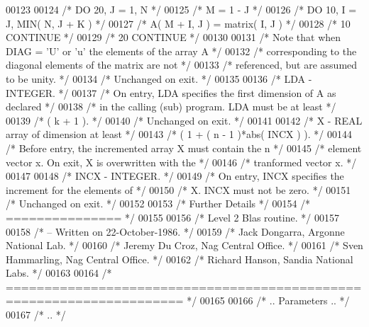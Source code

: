 \begin{DoxyCode}
00123 
00124 \textcolor{comment}{/*                 DO 20, J = 1, N */}
00125 \textcolor{comment}{/*                    M = 1 - J */}
00126 \textcolor{comment}{/*                    DO 10, I = J, MIN( N, J + K ) */}
00127 \textcolor{comment}{/*                       A( M + I, J ) = matrix( I, J ) */}
00128 \textcolor{comment}{/*              10    CONTINUE */}
00129 \textcolor{comment}{/*              20 CONTINUE */}
00130 
00131 \textcolor{comment}{/*           Note that when DIAG = 'U' or 'u' the elements of the array A */}
00132 \textcolor{comment}{/*           corresponding to the diagonal elements of the matrix are not */}
00133 \textcolor{comment}{/*           referenced, but are assumed to be unity. */}
00134 \textcolor{comment}{/*           Unchanged on exit. */}
00135 
00136 \textcolor{comment}{/*  LDA    - INTEGER. */}
00137 \textcolor{comment}{/*           On entry, LDA specifies the first dimension of A as declared */}
00138 \textcolor{comment}{/*           in the calling (sub) program. LDA must be at least */}
00139 \textcolor{comment}{/*           ( k + 1 ). */}
00140 \textcolor{comment}{/*           Unchanged on exit. */}
00141 
00142 \textcolor{comment}{/*  X      - REAL             array of dimension at least */}
00143 \textcolor{comment}{/*           ( 1 + ( n - 1 )*abs( INCX ) ). */}
00144 \textcolor{comment}{/*           Before entry, the incremented array X must contain the n */}
00145 \textcolor{comment}{/*           element vector x. On exit, X is overwritten with the */}
00146 \textcolor{comment}{/*           tranformed vector x. */}
00147 
00148 \textcolor{comment}{/*  INCX   - INTEGER. */}
00149 \textcolor{comment}{/*           On entry, INCX specifies the increment for the elements of */}
00150 \textcolor{comment}{/*           X. INCX must not be zero. */}
00151 \textcolor{comment}{/*           Unchanged on exit. */}
00152 
00153 \textcolor{comment}{/*  Further Details */}
00154 \textcolor{comment}{/*  =============== */}
00155 
00156 \textcolor{comment}{/*  Level 2 Blas routine. */}
00157 
00158 \textcolor{comment}{/*  -- Written on 22-October-1986. */}
00159 \textcolor{comment}{/*     Jack Dongarra, Argonne National Lab. */}
00160 \textcolor{comment}{/*     Jeremy Du Croz, Nag Central Office. */}
00161 \textcolor{comment}{/*     Sven Hammarling, Nag Central Office. */}
00162 \textcolor{comment}{/*     Richard Hanson, Sandia National Labs. */}
00163 
00164 \textcolor{comment}{/*  ===================================================================== */}
00165 
00166 \textcolor{comment}{/*     .. Parameters .. */}
00167 \textcolor{comment}{/*     .. */}

\end{DoxyCode}
